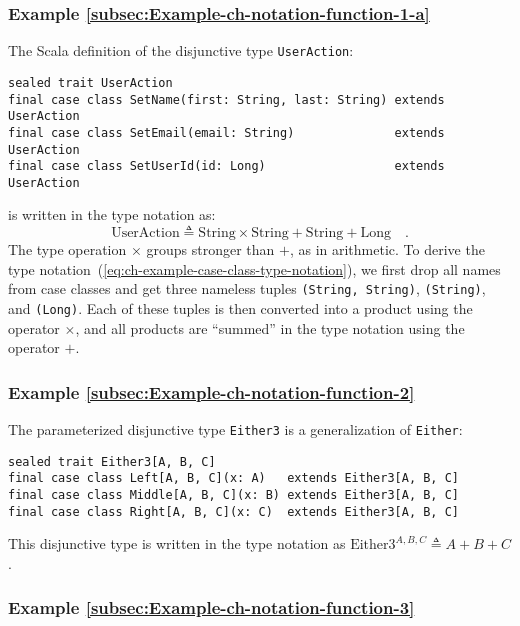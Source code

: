 \subsubsection{Example \label{subsec:Example-ch-notation-function-1-a}\ref{subsec:Example-ch-notation-function-1-a}}

The Scala definition of the disjunctive type \lstinline!UserAction!:
\begin{lstlisting}
sealed trait UserAction
final case class SetName(first: String, last: String) extends UserAction
final case class SetEmail(email: String)              extends UserAction
final case class SetUserId(id: Long)                  extends UserAction
\end{lstlisting}
is written in the type notation as:
\begin{equation}
\text{UserAction}\triangleq\text{String}\times\text{String}+\text{String}+\text{Long}\quad.\label{eq:ch-example-case-class-type-notation}
\end{equation}
The type operation $\times$ groups stronger than $+$, as in arithmetic.
To derive the type notation~(\ref{eq:ch-example-case-class-type-notation}),
we first drop all names from case classes and get three nameless tuples
\lstinline!(String, String)!, \lstinline!(String)!, and \lstinline!(Long)!.
Each of these tuples is then converted into a product using the operator
$\times$, and all products are \textsf{``}summed\textsf{''} in the type notation
using the operator $+$.

\subsubsection{Example \label{subsec:Example-ch-notation-function-2}\ref{subsec:Example-ch-notation-function-2}}

The parameterized disjunctive type \lstinline!Either3! is a generalization
of \lstinline!Either!:
\begin{lstlisting}
sealed trait Either3[A, B, C]
final case class Left[A, B, C](x: A)   extends Either3[A, B, C]
final case class Middle[A, B, C](x: B) extends Either3[A, B, C]
final case class Right[A, B, C](x: C)  extends Either3[A, B, C]
\end{lstlisting}
This disjunctive type is written in the type notation as $\text{Either3}^{A,B,C}\triangleq A+B+C$.

\subsubsection{Example \label{subsec:Example-ch-notation-function-3}\ref{subsec:Example-ch-notation-function-3}}

